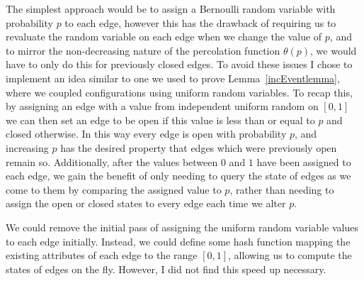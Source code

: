 \documentclass[a4paper,11pt]{article}
\theoremstyle{definition}
\begin{document}
The simplest approach would be to assign a Bernoulli random variable with probability $p$ to each edge, however this has the drawback of requiring us to revaluate the random variable on each edge when we change the value of $p$, and to mirror the non-decreasing nature of the percolation function $\theta(p)$, we would have to only do this for previously closed edges. To avoid these issues I chose to implement an idea similar to one we used to prove Lemma~\ref{incEventlemma}, where we coupled configurations using uniform random variables. To recap this, by assigning an edge with a value from independent uniform random on $[0,1]$ we can then set an edge to be open if this value is less than or equal to $p$ and closed otherwise. In this way every edge is open with probability $p$, and increasing $p$ has the desired property that edges which were previously open remain so. Additionally, after the values between $0$ and $1$ have been assigned to each edge, we gain the benefit of only needing to query the state of edges as we come to them by comparing the assigned value to $p$, rather than needing to assign the open or closed states to every edge each time we alter $p$.

We could remove the initial pass of assigning the uniform random variable values to each edge initially. Instead, we could define some hash function mapping the existing attributes of each edge to the range $[0,1]$, allowing us to compute the states of edges on the fly. However, I did not find this speed up necessary.
\end{document}
